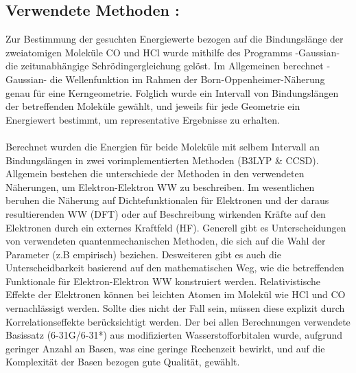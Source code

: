 \subsection{Verwendete Methoden :}
Zur Bestimmung der gesuchten Energiewerte bezogen auf die Bindungslänge der zweiatomigen Moleküle CO und HCl wurde mithilfe des Programms -Gaussian- die zeitunabhängige Schrödingergleichung gelöst. Im Allgemeinen berechnet -Gaussian- die Wellenfunktion im Rahmen der Born-Oppenheimer-Näherung genau für eine Kerngeometrie. Folglich wurde ein Intervall von Bindungslängen der betreffenden Moleküle gewählt, und jeweils für jede Geometrie ein Energiewert bestimmt, um representative Ergebnisse zu erhalten.\\	
\\
Berechnet wurden die Energien für beide Moleküle mit selbem Intervall an Bindungslängen in zwei vorimplementierten Methoden (B3LYP \& CCSD). Allgemein bestehen die unterschiede der Methoden in den verwendeten Näherungen, um Elektron-Elektron WW zu beschreiben. Im wesentlichen beruhen die Näherung auf Dichtefunktionalen für Elektronen und der daraus resultierenden WW (DFT) oder auf Beschreibung wirkenden Kräfte auf den Elektronen durch ein externes Kraftfeld (HF). Generell gibt es Unterscheidungen von verwendeten quantenmechanischen Methoden, die sich auf die Wahl der Parameter (z.B empirisch) beziehen. Desweiteren gibt es auch die Unterscheidbarkeit basierend auf den mathematischen Weg, wie die betreffenden Funktionale für Elektron-Elektron WW konstruiert werden.  Relativistische Effekte der Elektronen können bei leichten Atomen im Molekül wie HCl und CO vernachlässigt werden. Sollte dies nicht der Fall sein, müssen diese explizit durch Korrelationseffekte berücksichtigt werden. Der bei allen Berechnungen verwendete Basissatz (6-31G/6-31*) aus modifizierten Wasserstofforbitalen wurde, aufgrund geringer Anzahl an Basen, was eine geringe Rechenzeit bewirkt, und auf die Komplexität der Basen bezogen gute Qualität, gewählt.\\


%